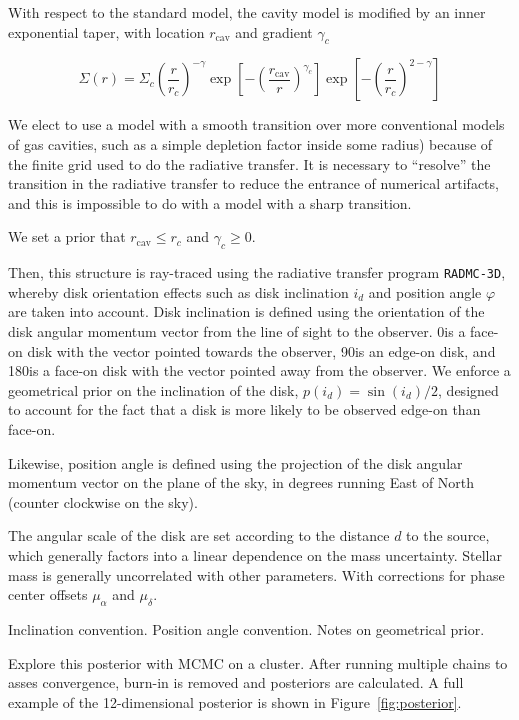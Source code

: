 \documentclass{aastex6}
\begin{document}
With respect to the standard model, the cavity model is modified by an inner exponential taper, with location $r_\textrm{cav}$ and gradient $\gamma_c$

\begin{equation}
\Sigma(r) = \Sigma_c \left (\frac{r}{r_c} \right)^{- \gamma} \exp \left [- \left ( \frac{r_\mathrm{cav}}{r} \right)^{\gamma_c} \right ]  \exp \left[ - \left(\frac{r}{r_c} \right)^{2 - \gamma} \right]
\end{equation}

We elect to use a model with a smooth transition over more conventional models of gas cavities, such as a simple depletion factor inside some radius) because of the finite grid used to do the radiative transfer. It is necessary to ``resolve'' the transition in the radiative transfer to reduce the entrance of numerical artifacts, and this is impossible to do with a model with a sharp transition.

We set a prior that $r_\textrm{cav} \leq r_c$ and $\gamma_c \geq 0$.

Then, this structure is ray-traced using the radiative transfer program \texttt{RADMC-3D}, whereby disk orientation effects such as disk inclination $i_d$ and position angle $\varphi$ are taken into account. Disk inclination is defined using the orientation of the disk angular momentum vector from the line of sight to the observer. 0\degr is a face-on disk with the vector pointed towards the observer, 90\degr is an edge-on disk, and 180\degr is a face-on disk with the vector pointed away from the observer. We enforce a geometrical prior on the inclination of the disk, $p(i_d) =  \sin(i_d)/2$, designed to account for the fact that a disk is more likely to be observed edge-on than face-on.

Likewise, position angle is defined using the projection of the disk angular momentum vector on the plane of the sky, in degrees running East of North (counter clockwise on the sky).

The angular scale of the disk are set according to the distance $d$ to the source, which generally factors into a linear dependence on the mass uncertainty. Stellar mass is generally uncorrelated with other parameters. With corrections for phase center offsets $\mu_\alpha$ and $\mu_\delta$.



Inclination convention. Position angle convention. Notes on geometrical prior.

Explore this posterior with MCMC on a cluster. After running multiple chains to asses convergence, burn-in is removed and posteriors are calculated. A full example of the 12-dimensional posterior is shown in Figure~\ref{fig:posterior}.
\end{document}
